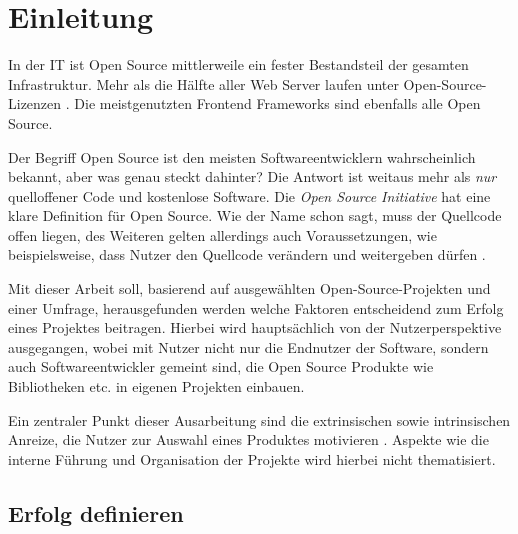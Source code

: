 \chapter{Einleitung}



In der IT ist Open Source mittlerweile ein fester Bestandsteil der gesamten Infrastruktur.
Mehr als die Hälfte aller Web Server laufen unter Open-Source-Lizenzen \cite{W3Techs_WebServer}.
Die meistgenutzten Frontend Frameworks sind ebenfalls alle Open Source. \cite{StackOverflowSurvey2021}


Der Begriff Open Source ist den meisten Softwareentwicklern wahrscheinlich bekannt,
aber was genau steckt dahinter? Die Antwort ist weitaus mehr als \textit{nur} quelloffener Code
und kostenlose Software.
Die \textit{Open Source Initiative} hat eine klare Definition für Open Source.
Wie der Name schon sagt, muss der Quellcode offen liegen, des Weiteren gelten allerdings auch
Voraussetzungen, wie beispielsweise, dass Nutzer den Quellcode verändern und weitergeben
dürfen \cite{OpenSourceDefinition}.


Mit dieser Arbeit soll, basierend auf ausgewählten Open-Source-Projekten und einer Umfrage,
herausgefunden werden welche Faktoren entscheidend zum Erfolg eines Projektes beitragen.
Hierbei wird hauptsächlich von der Nutzerperspektive ausgegangen, wobei mit Nutzer nicht nur die
Endnutzer der Software, sondern auch Softwareentwickler gemeint sind, die Open Source Produkte wie
Bibliotheken etc. in eigenen Projekten einbauen.

Ein zentraler Punkt dieser Ausarbeitung sind die extrinsischen sowie intrinsischen Anreize,
die Nutzer zur Auswahl eines Produktes motivieren \cite{midhaFactorsAffectingSuccess2012}. %
Aspekte wie die interne Führung und Organisation der Projekte wird hierbei nicht thematisiert.

\section{Erfolg definieren}


